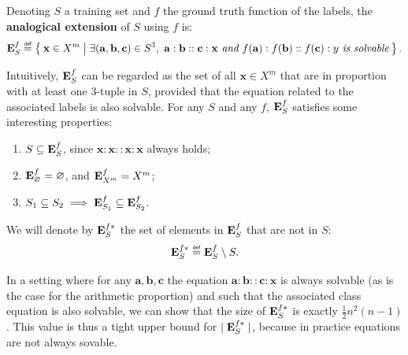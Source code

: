 \begin{definition}
  \label{DEF:analogical_extension}
  Denoting $S$ a training set and $f$ the ground truth function of the labels,
  the \textbf{analogical extension} of $S$ using $f$ is:
  $$
  \esf \eqdef \Set{ \mathbf{x} \in X^m |  \exists
  (\mathbf{a},\mathbf{b},\mathbf{c}) \in S^3, ~ \mathbf{a} : \mathbf{b} ::
  \mathbf{c} : \mathbf{x} \emph{ and } f(\mathbf{a}) : f(\mathbf{b}) ::
  f(\mathbf{c}) : y \emph{ is solvable}}.
  $$
\end{definition}

Intuitively,  $\mathbf{E}_{S}^{f}$ can be regarded as the set of all $\mathbf{x} \in X^m$
that are in proportion with at least one 3-tuple in $S$, provided that the
equation related to the associated labels is also solvable. For any $S$ and any
$f$, $\mathbf{E}_{S}^{f}$ satisfies some interesting properties: \begin{enumerate}
\item $S \subseteq \mathbf{E}_{S}^{f}$, since $\mathbf{x} : \mathbf{x} :: \mathbf{x}
  :\mathbf{x}$ always holds;
\item $\mathbf{E}_{\varnothing}^{f} = \varnothing$, and $\mathbf{E}_{X^m}^{f}=X^m$;
\item $S_1 \subseteq S_2 \implies \mathbf{E}_{S_1}^{f} \subseteq \mathbf{E}_{S_2}^{f}$.
\end{enumerate}

\begin{definition}
  \label{DEF:ae_star}
We will denote by $\mathbf{E}_{S}^{f*}$ the set of elements in $\mathbf{E}_{S}^{f}$ that are not in $S$:
$$\esfs \eqdef \esf \setminus S.$$
\end{definition}

\noindent
In a setting where for any $\mathbf{a},\mathbf{b}, \mathbf{c}$ the equation
$\mathbf{a} : \mathbf{b} :: \mathbf{c} : \mathbf{x}$ is always solvable (as is
the case for the arithmetic proportion) and such that the associated class
equation is also solvable, we can show that the size of $\mathbf{E}_{S}^{f*}$ is exactly
$\frac{1}{2} n^2(n - 1)$. This value is thus a tight upper bound for $\mid
\mathbf{E}_{S}^{f*}\mid$, because in practice equations are not always sovable.

